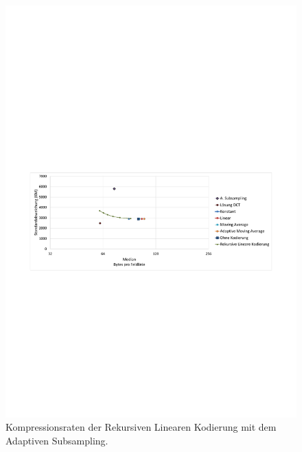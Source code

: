 \begin{figure}[!htbp]
	\center
	\includegraphics[trim = 1.8cm 11cm 1.8cm 12.6cm, clip=true,width=1\textwidth,keepaspectratio]{./pictures/resultate/loesung2/variante2/resultate_median.pdf}
	
	\caption{Kompressionsraten der Rekursiven Linearen Kodierung mit dem Adaptiven Subsampling.}
	\label{resultate:loesung2:adaptive:median}
\end{figure}
